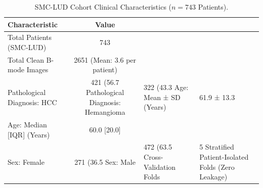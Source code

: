 \begin{table}[h]
\centering
\caption{SMC-LUD Cohort Clinical Characteristics ($n=743$ Patients).}
\label{tab:demographics}
\begin{tabular}{lc}
\hline
\textbf{Characteristic} & \textbf{Value} \\
\hline
Total Patients (SMC-LUD) & 743 \\
Total Clean B-mode Images & 2651 (Mean: 3.6 per patient) \\
Pathological Diagnosis: HCC & 421 (56.7%
Pathological Diagnosis: Hemangioma & 322 (43.3%
Age: Mean ± SD (Years) & 61.9 ± 13.3 \\
Age: Median [IQR] (Years) & 60.0 [20.0] \\
Sex: Female & 271 (36.5%
Sex: Male & 472 (63.5%
Cross-Validation Folds & 5 Stratified Patient-Isolated Folds (Zero Leakage) \\
\hline
\end{tabular}
\end{table}
